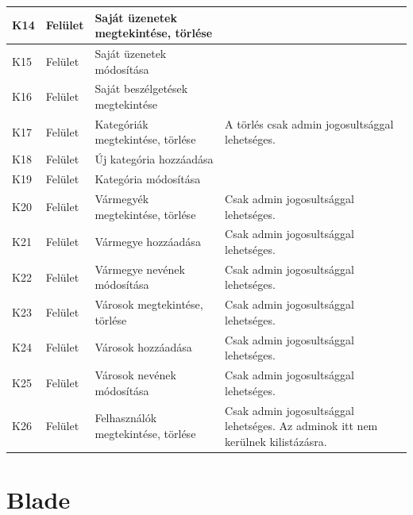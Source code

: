 \documentclass[]{thesis-ekf}
\theoremstyle{definition}
\theoremstyle{remark}
\begin{document}
\begin{longtable}{|l|l|p{3cm}|p{8cm}|}
				K14 & Felület & Saját üzenetek megtekintése, törlése & ~ \\ \hline
				K15 & Felület & Saját üzenetek módosítása & ~ \\ \hline
				K16 & Felület & Saját beszélgetések megtekintése & ~ \\ \hline
				K17 & Felület & Kategóriák megtekintése, törlése & A törlés csak admin jogosultsággal lehetséges. \\ \hline
				K18 & Felület & Új kategória hozzáadása & ~ \\ \hline
				K19 & Felület & Kategória módosítása & ~ \\ \hline
				K20 & Felület & Vármegyék megtekintése, törlése & Csak admin jogosultsággal lehetséges. \\ \hline
				K21 & Felület & Vármegye hozzáadása & Csak admin jogosultsággal lehetséges. \\ \hline
				K22 & Felület & Vármegye nevének módosítása & Csak admin jogosultsággal lehetséges. \\ \hline
				K23 & Felület & Városok megtekintése, törlése & Csak admin jogosultsággal lehetséges. \\ \hline
				K24 & Felület & Városok hozzáadása & Csak admin jogosultsággal lehetséges. \\ \hline
				K25 & Felület & Városok nevének módosítása & Csak admin jogosultsággal lehetséges. \\ \hline
				K26 & Felület & Felhasználók megtekintése, törlése & Csak admin jogosultsággal lehetséges. Az adminok itt nem kerülnek kilistázásra. \\ \hline
				
			\end{longtable}
			\section{Blade}
					
\end{document}
